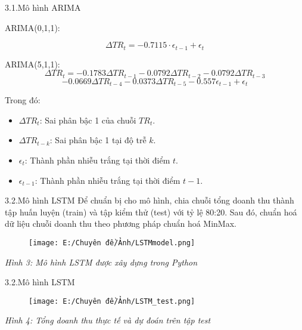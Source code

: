 \documentclass{beamer}
\begin{document}
	\begin{frame}{3.1.Mô hình ARIMA}
		\begin{block}{ARIMA(0,1,1):}
           
           \[
           \Delta TR_t = -0.7115 \cdot \epsilon_{t-1} + \epsilon_t
           \]
		\end{block}
		\begin{block}{ARIMA(5,1,1):}
			\[
			\Delta TR_t = -0.1783\Delta TR_{t-1} - 0.0792\Delta TR_{t-2} - 0.0792\Delta TR_{t-3}
			\]
			\[- 0.0669\Delta TR_{t-4} - 0.0373\Delta TR_{t-5} - 0.557\epsilon_{t-1} + \epsilon_t
			\]
		\end{block}
		Trong đó:
		\begin{itemize}
			\item $\Delta TR_t$: Sai phân bậc 1 của chuỗi $TR_t$.
			\item $\Delta TR_{t-k}$: Sai phân bậc 1 tại độ trễ $k$.
			\item $\epsilon_t$: Thành phần nhiễu trắng tại thời điểm $t$.
			\item $\epsilon_{t-1}$: Thành phần nhiễu trắng tại thời điểm $t-1$.
		\end{itemize}
	\end{frame}
	
	\begin{frame}{3.2.Mô hình LSTM}
		Để chuẩn bị cho mô hình, chia chuỗi tổng doanh thu thành tập huấn luyện (train) và tập kiểm thử (test) với tỷ lệ 80:20. Sau đó, chuẩn hoá dữ liệu chuỗi doanh thu theo phương pháp chuẩn hoá MinMax.
		\begin{figure}
			\centering
			\texttt{[image: E:/Chuyên đề/Ảnh/LSTMmodel.png]}
			\hfill
			
		\end{figure}
		\vspace{0.01cm}
		\centering
		\textit{Hình 3: Mô hình LSTM được xây dựng trong Python }
	\end{frame}
	\begin{frame}{3.2.Mô hình LSTM}
		\begin{figure}
			\centering
			\texttt{[image: E:/Chuyên đề/Ảnh/LSTM\_test.png]}
			\hfill

		\end{figure}
		\vspace{0.01cm}
		\centering
		\textit{Hình 4: Tổng doanh thu thực tế và dự đoán trên tập test }
	\end{frame}
	
\end{document}
